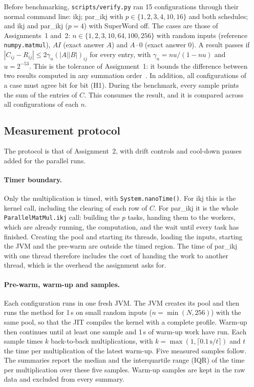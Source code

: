 \documentclass[11pt,a4paper]{article}
\begin{document}
Before benchmarking, \texttt{scripts/verify.py} ran 15 configurations through
their normal command line: ikj; par\_ikj with $p\in\{1,2,3,4,10,16\}$ and both
schedules; and ikj and par\_ikj ($p=4$) with SuperWord off. The cases are those
of Assignments~1 and~2: $n\in\{1,2,3,10,64,100,256\}$ with random inputs
(reference \texttt{numpy.matmul}), $AI$ (exact answer $A$) and $A\cdot0$ (exact
answer $0$). A result passes if $|C_{ij}-R_{ij}|\le 2\gamma_n(|A||B|)_{ij}$ for
every entry, with $\gamma_n=nu/(1-nu)$ and $u=2^{-53}$. This is the tolerance of
Assignment~1: it bounds the difference between two results computed in any
summation order~\cite{higham2002}. In addition, all configurations of a case
must agree bit for bit (H1). During the benchmark, every sample prints the sum
of the entries of $C$. This consumes the result, and it is compared across all
configurations of each $n$.

\subsection{Measurement protocol}
\label{sec:protocol}

The protocol is that of Assignment~2, with drift controls and cool-down pauses
added for the parallel runs.

\paragraph{Timer boundary.} Only the multiplication is timed, with
\texttt{System.nanoTime()}. For ikj this is the kernel call, including the
clearing of each row of $C$. For par\_ikj it is the whole
\texttt{ParallelMatMul.ikj} call: building the $p$ tasks, handing them to the
workers, which are already running, the computation, and the wait until every
task has finished. Creating the pool and starting its threads, loading the
inputs, starting the JVM and the pre-warm are outside the timed region. The
time of par\_ikj with one thread therefore includes the cost of handing the work
to another thread, which is the overhead the assignment asks for.

\paragraph{Pre-warm, warm-up and samples.} Each configuration runs in one fresh
JVM. The JVM creates its pool and then runs the method for 1\,s on small random
inputs ($n=\min(N,256)$) with the same pool, so that the JIT compiles the kernel
with a complete profile. Warm-up then continues until at least one sample and
1\,s of warm-up work have run. Each sample times $k$ back-to-back
multiplications, with $k=\max(1,\lceil 0.1\,\text{s}/t\rceil)$ and $t$ the time
per multiplication of the latest warm-up. Five measured samples follow. The
summaries report the median and the interquartile range (IQR) of the time per
multiplication over these five samples. Warm-up samples are kept in the raw
data and excluded from every summary.
\end{document}
